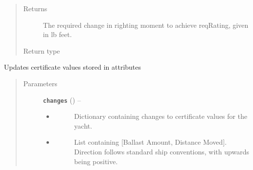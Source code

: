 \documentclass[letterpaper,10pt,english]{sphinxmanual}
\begin{document}
\begin{fulllineitems}
\begin{fulllineitems}
\begin{quote}
\begin{description}
\item[{Returns}] \leavevmode
The required change in righting moment to achieve reqRating,
given in lb feet.

\item[{Return type}] \leavevmode
{}

\end{description}\end{quote}

\end{fulllineitems}


\begin{fulllineitems}
\label{index:IORAnalysis.IOR.updateCert}
Updates certificate values stored in attributes
\begin{quote}\begin{description}
\item[{Parameters}] \leavevmode
\textbf{\texttt{changes}} () -- \begin{itemize}
\item {} \begin{description}
\item[{}] \leavevmode
Dictionary containing changes to certificate values for
the yacht.

\end{description}

\item {} \begin{description}
\item[{}] \leavevmode
List containing {[}Ballast Amount, Distance  Moved{]}.
Direction follows standard ship conventions, with
upwards being positive.

\end{description}

\end{itemize}


\end{description}\end{quote}

\end{fulllineitems}


\end{fulllineitems}

\end{document}
